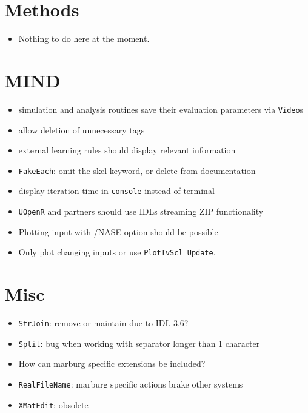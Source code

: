 \documentclass[12pt]{article}
\begin{document}
\section{Methods}
\begin{itemize}
\item Nothing to do here at the moment.
\end{itemize}


\section{MIND}
\begin{itemize}
\item simulation and analysis routines save their evaluation parameters via \texttt{Video}s
\item allow deletion of unnecessary tags
\item external learning rules should display relevant information
\item \texttt{FakeEach}: omit the skel keyword, or delete from documentation
\item display iteration time in \texttt{console} instead of terminal
\item \texttt{UOpenR} and partners should use IDLs streaming ZIP functionality
\item Plotting input with /NASE option should be possible
\item Only plot changing inputs or use \texttt{PlotTvScl_Update}.
\end{itemize}



\section{Misc}
\begin{itemize}
\item \texttt{StrJoin}: remove or maintain due to IDL 3.6?
\item \texttt{Split}: bug when working with separator longer than 1 character
\item How can marburg specific extensions be included?
\item \texttt{RealFileName}: marburg specific actions brake other systems
\item \texttt{XMatEdit}: obsolete 
\end{itemize}
\end{document}
